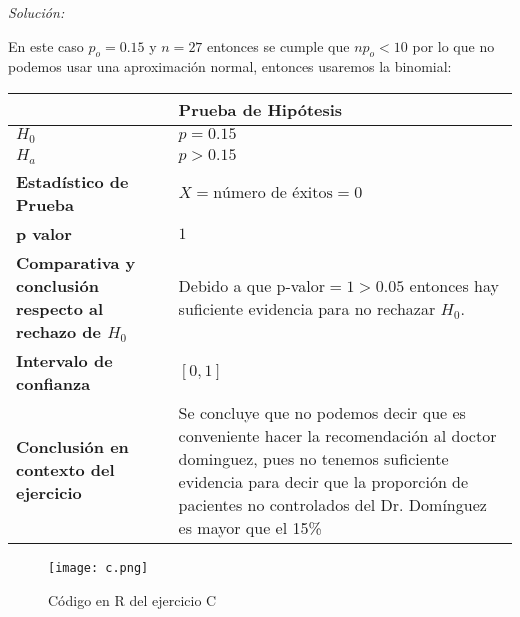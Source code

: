 \documentclass[12pt]{article}
\newenvironment{sol}
    {\emph{Solución:}
    }
    {
    }
\begin{document}
\begin{sol}
En este caso $p_o=0.15$ y $n=27$ entonces se cumple que $np_o<10$ por lo que no podemos usar una aproximación normal, entonces usaremos la binomial:
\begin{table}[h!]
\centering
\begin{tabular}{|>{\raggedright\arraybackslash}m{6cm}|>{\raggedright\arraybackslash}m{6cm}|}
\hline
 & \textbf{Prueba de Hipótesis} \\ \hline
$H_0$ & $p=0.15$ \\ \hline
$H_a$ & $p>0.15$ \\ \hline
\textbf{Estadístico de Prueba} & \vspace{0.5cm}$X=\text{número de éxitos}=0$\vspace{0.5cm} \\ \hline
\textbf{p valor} & $1$ \\ \hline
\textbf{Comparativa y conclusión respecto al rechazo de $H_0$} & Debido a que p-valor$=1>0.05$ entonces hay suficiente evidencia para no rechazar $H_0$. \\ \hline
\textbf{Intervalo de confianza} & $[0,1]$ \\ \hline
\textbf{Conclusión en contexto del ejercicio} & Se concluye que no podemos decir que es conveniente hacer la recomendación al doctor dominguez, pues no tenemos suficiente evidencia para decir que la proporción de pacientes no controlados del Dr. Domínguez es mayor que el 15\% \\ \hline
\end{tabular}
\label{tab:hipotesis}
\end{table}

\begin{figure}[h]  %
    \centering      %
    \texttt{[image: c.png]} 
    \caption{Código en R del ejercicio C}
\end{figure}
\end{sol}
\pagebreak

\end{document}
